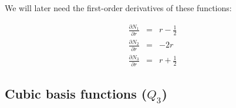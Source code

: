 We will later need the first-order derivatives of these functions:
\begin{mdframed}[backgroundcolor=blue!5]
\begin{eqnarray}
\frac{\partial N_1}{\partial r} &=& r-\frac{1}{2} \nonumber\\
\frac{\partial N_2}{\partial r} &=& -2r \nonumber\\ 
\frac{\partial N_3}{\partial r} &=& r+\frac{1}{2}
\end{eqnarray}
\end{mdframed}


\subsection{Cubic basis functions ($Q_3$) \label{sec:bf3}}

